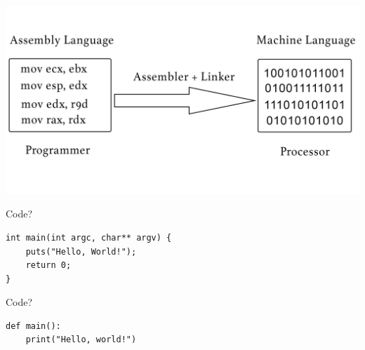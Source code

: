 \documentclass[aspectratio=169]{beamer}
\begin{document}
\begin{frame}{}
    \begin{center}
        \includegraphics[width=\textwidth]{assembly.png}
    \end{center}
\end{frame}

\begin{frame}[fragile]{Code?}
\begin{verbatim}
int main(int argc, char** argv) {
    puts("Hello, World!");
    return 0;
}
\end{verbatim}
\end{frame}
\begin{frame}[fragile]{Code?}
\begin{verbatim}
def main():
    print("Hello, world!")
\end{verbatim}
\end{frame}
\end{document}
